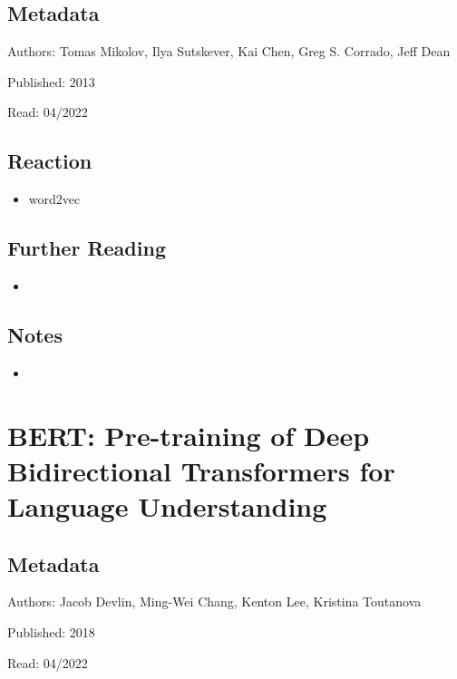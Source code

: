 \documentclass{article}
\begin{document}
\subsection*{Metadata}

\noindent Authors: Tomas Mikolov, Ilya Sutskever, Kai Chen, Greg S. Corrado, Jeff Dean

\noindent Published: 2013

\noindent Read: 04/2022

\subsection*{Reaction}
\begin{itemize}
\item word2vec
\end{itemize}

\subsection*{Further Reading}
\begin{itemize}
	\item
\end{itemize}

\subsection*{Notes}

\begin{itemize}
	\item
\end{itemize}

\pagebreak


\section*{BERT: Pre-training of Deep Bidirectional Transformers for Language Understanding}

\subsection*{Metadata}

\noindent Authors: Jacob Devlin, Ming-Wei Chang, Kenton Lee, Kristina Toutanova

\noindent Published: 2018

\noindent Read: 04/2022
\end{document}

